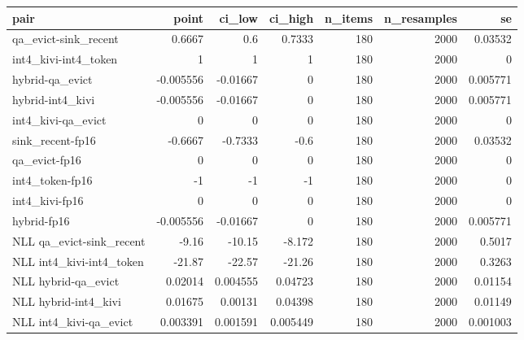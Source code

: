 \begin{table}
\label{tab:task2c_kv_bootstrap}
\begin{tabular}{lrrrrrr}
\toprule
pair & point & ci\_low & ci\_high & n\_items & n\_resamples & se \\
\midrule
qa\_evict-sink\_recent & 0.6667 & 0.6 & 0.7333 & 180 & 2000 & 0.03532 \\
int4\_kivi-int4\_token & 1 & 1 & 1 & 180 & 2000 & 0 \\
hybrid-qa\_evict & -0.005556 & -0.01667 & 0 & 180 & 2000 & 0.005771 \\
hybrid-int4\_kivi & -0.005556 & -0.01667 & 0 & 180 & 2000 & 0.005771 \\
int4\_kivi-qa\_evict & 0 & 0 & 0 & 180 & 2000 & 0 \\
sink\_recent-fp16 & -0.6667 & -0.7333 & -0.6 & 180 & 2000 & 0.03532 \\
qa\_evict-fp16 & 0 & 0 & 0 & 180 & 2000 & 0 \\
int4\_token-fp16 & -1 & -1 & -1 & 180 & 2000 & 0 \\
int4\_kivi-fp16 & 0 & 0 & 0 & 180 & 2000 & 0 \\
hybrid-fp16 & -0.005556 & -0.01667 & 0 & 180 & 2000 & 0.005771 \\
NLL qa\_evict-sink\_recent & -9.16 & -10.15 & -8.172 & 180 & 2000 & 0.5017 \\
NLL int4\_kivi-int4\_token & -21.87 & -22.57 & -21.26 & 180 & 2000 & 0.3263 \\
NLL hybrid-qa\_evict & 0.02014 & 0.004555 & 0.04723 & 180 & 2000 & 0.01154 \\
NLL hybrid-int4\_kivi & 0.01675 & 0.00131 & 0.04398 & 180 & 2000 & 0.01149 \\
NLL int4\_kivi-qa\_evict & 0.003391 & 0.001591 & 0.005449 & 180 & 2000 & 0.001003 \\
\bottomrule
\end{tabular}
\end{table}
